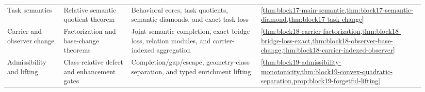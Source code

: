\begin{table}[htbp]
\begin{tabularx}{\textwidth}{@{}L{0.16\textwidth}L{0.22\textwidth}YL{0.14\textwidth}@{}}
Task semantics & Relative semantic quotient theorem & Behavioral cores, task quotients, semantic diamonds, and exact task loss & \cref{thm:block17-main-semantic,thm:block17-semantic-diamond,thm:block17-task-change} \\
Carrier and observer change & Factorization and base-change theorems & Joint semantic completion, exact bridge loss, relation modules, and carrier-indexed aggregation & \cref{thm:block18-carrier-factorization,thm:block18-bridge-loss-exact,thm:block18-observer-base-change,thm:block18-carrier-indexed-observer} \\
Admissibility and lifting & Class-relative defect and enhancement gates & Completion/gap/escape, geometry-class separation, and typed enrichment lifting & \cref{thm:block19-admissibility-monotonicity,thm:block19-convex-quadratic-separation,prop:block19-forgetful-lifting} \\
\bottomrule
\end{tabularx}
\end{table}
